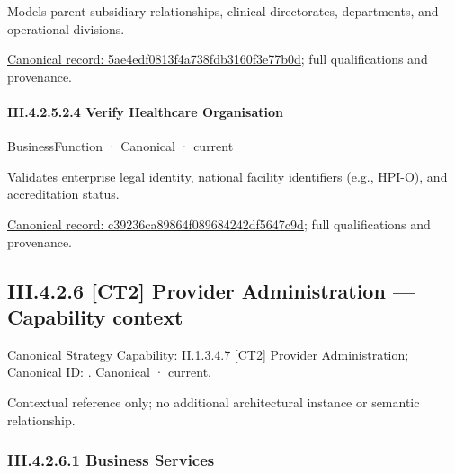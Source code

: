 Models parent-subsidiary relationships, clinical directorates, departments, and operational divisions.


{\footnotesize \href{../../../../../../../continuum/business/business-function/5ae4edf0813f4a738fdb3160f3e77b0d.md}{Canonical record: 5ae4edf0813f4a738fdb3160f3e77b0d}; full qualifications and provenance.}\par
\paragraph*{III.4.2.5.2.4 Verify Healthcare Organisation}
\label{navigation:III.4.2.5.2.4}

\label{element:c39236ca89864f089684242df5647c9d}
{\small BusinessFunction · Canonical · current}\par

Validates enterprise legal identity, national facility identifiers (e.g., HPI-O), and accreditation status.


{\footnotesize \href{../../../../../../../continuum/business/business-function/c39236ca89864f089684242df5647c9d.md}{Canonical record: c39236ca89864f089684242df5647c9d}; full qualifications and provenance.}\par
\subsection*{III.4.2.6 [CT2] Provider Administration — Capability context}
\label{navigation:III.4.2.6}

{\small Canonical Strategy Capability: II.1.3.4.7 \hyperref[element:d6312f85968a4209bafff5ed009297a6]{[CT2] Provider Administration}; Canonical ID: \texttt{}. Canonical · current.}\par
Contextual reference only; no additional architectural instance or semantic relationship.\par
\subsubsection*{III.4.2.6.1 Business Services}
\label{navigation:III.4.2.6.1}

